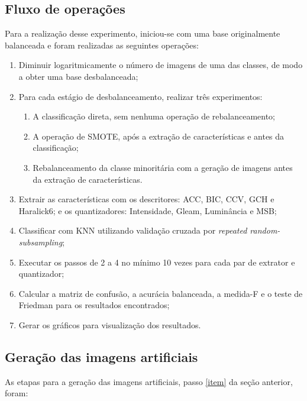 \subsection{Fluxo de operações}

Para a realização desse experimento, iniciou-se com uma base originalmente balanceada e foram realizadas as seguintes operações:

\begin{enumerate}
\item Diminuir logaritmicamente o número de imagens de uma das classes, de modo a obter uma base desbalanceada;
\item Para cada estágio de desbalanceamento, realizar três experimentos:
\begin{enumerate}
\item A classificação direta, sem nenhuma operação de rebalanceamento;
\item A operação de SMOTE, após a extração de características e antes da classificação;
\item Rebalanceamento da classe minoritária com a geração de imagens antes da extração de características.
\label{item}
\end{enumerate}
\item Extrair as características com os descritores: ACC, BIC, CCV, GCH e Haralick6; e os quantizadores: Intensidade, Gleam, Luminância e MSB;
\item Classificar com KNN utilizando validação cruzada por \textit{repeated random-subsampling};
\item Executar os passos de 2 a 4 no mínimo 10 vezes para cada par de extrator e quantizador;
\item Calcular a matriz de confusão, a acurácia balanceada, a medida-F e o teste de Friedman para os resultados encontrados;
\item Gerar os gráficos para visualização dos resultados.
\end{enumerate}

\subsection{Geração das imagens artificiais}

As etapas para a geração das imagens artificiais, passo \ref{item} da seção anterior, foram:

